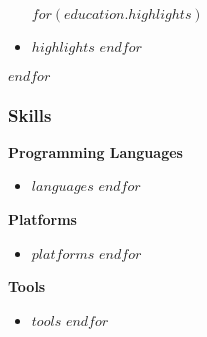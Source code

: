 \begin{itemize}
\tightlist
$for(education.highlights)$
\item
  $highlights$
$endfor$
\end{itemize}
$endfor$

\subsubsection{Skills}

\textbf{Programming Languages}

\begin{itemize}
\tightlist
$for(skills.languages)$
\item $languages$
$endfor$
\end{itemize}

\textbf{Platforms}

\begin{itemize}
\tightlist
$for(skills.platforms)$
\item $platforms$
$endfor$
\end{itemize}

\textbf{Tools}

\begin{itemize}
\tightlist
$for(skills.tools)$
\item $tools$
$endfor$
\end{itemize}

